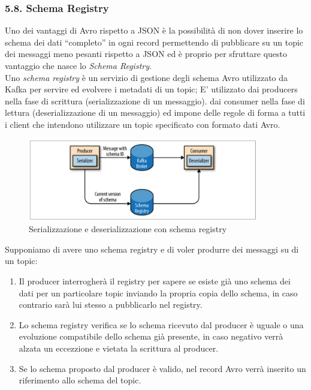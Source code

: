 \documentclass[]{article}
\providecommand{\tightlist}{%
  \setlength{\itemsep}{0pt}\setlength{\parskip}{0pt}}
\begin{document}
\newpage

\subsubsection{5.8. Schema Registry}\label{schema-registry}

Uno dei vantaggi di Avro rispetto a JSON è la possibilità di non dover
inserire lo schema dei dati ``completo'' in ogni record permettendo di
pubblicare su un topic dei messaggi meno pesanti rispetto a JSON ed è
proprio per sfruttare questo vantaggio che nasce lo \emph{Schema
Registry}.\\
Uno \emph{schema registry} è un servizio di gestione degli schema Avro
utilizzato da Kafka per servire ed evolvere i metadati di un topic; E'
utilizzato dai producers nella fase di scrittura (serializzazione di un
messaggio). dai consumer nella fase di lettura (deserializzazione di un
messaggio) ed impone delle regole di forma a tutti i client che
intendono utilizzare un topic specificato con formato dati Avro.

\begin{figure}
\centering
\includegraphics[width=0.90000\textwidth]{../images/schema-registry.png}
\caption{Serializzazione e deserializzazione con schema registry
\label{figure_5}}
\end{figure}

Supponiamo di avere uno schema registry e di voler produrre dei messaggi
su di un topic:

\begin{enumerate}
\def\labelenumi{\arabic{enumi}.}
\tightlist
\item
  Il producer interrogherà il registry per sapere se esiste già uno
  schema dei dati per un particolare topic inviando la propria copia
  dello schema, in caso contrario sarà lui stesso a pubblicarlo nel
  registry.
\item
  Lo schema registry verifica se lo schema ricevuto dal producer è
  uguale o una evoluzione compatibile dello schema già presente, in caso
  negativo verrà alzata un eccezzione e vietata la scrittura al
  producer.
\item
  Se lo schema proposto dal producer è valido, nel record Avro verrà
  inserito un riferimento allo schema del topic.
\end{enumerate}
\end{document}

